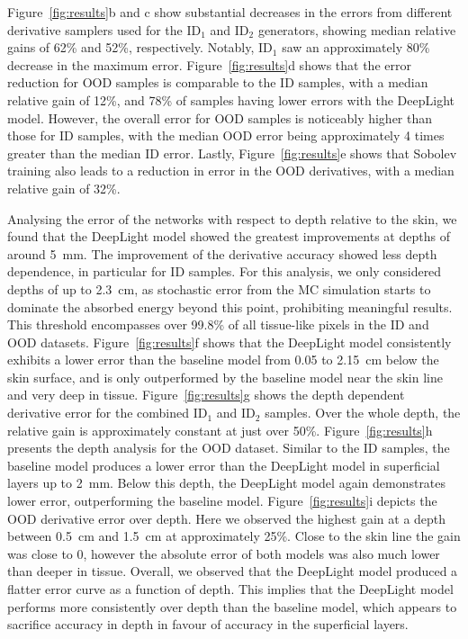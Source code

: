 \documentclass[journal,twoside,web]{ieeecolor}
\begin{document}
Figure~\ref{fig:results}b and c show substantial decreases in the errors from different derivative samplers used for the ID$_1$ and ID$_2$ generators, showing median relative gains of 62\% and 52\%, respectively. %
Notably, ID$_1$ saw an approximately 80\% decrease in the maximum error. %
Figure~\ref{fig:results}d shows that the error reduction for OOD samples is comparable to the ID samples, with a median relative gain of 12\%, and 78\% of samples having lower errors with the DeepLight model. %
However, the overall error for OOD samples is noticeably higher than those for ID samples, with the median OOD error being approximately 4 times greater than the median ID error. %
Lastly, Figure~\ref{fig:results}e shows that Sobolev training also leads to a reduction in error in the OOD derivatives, with a median relative gain of 32\%.\par %
    
Analysing the error of the networks with respect to depth relative to the skin, we found that the DeepLight model showed the greatest improvements at depths of around 5~mm. %
The improvement of the derivative accuracy showed less depth dependence, in particular for ID samples. %
For this analysis, we only considered depths of up to 2.3~cm, as stochastic error from the MC simulation starts to dominate the absorbed energy beyond this point, prohibiting meaningful results. %
This threshold encompasses over 99.8\% of all tissue-like pixels in the ID and OOD datasets. %
Figure~\ref{fig:results}f shows that the DeepLight model consistently exhibits a lower error than the baseline model from 0.05 to 2.15~cm below the skin surface, and is only outperformed by the baseline model near the skin line and very deep in tissue. %
Figure~\ref{fig:results}g shows the depth dependent derivative error for the combined ID$_1$ and ID$_2$ samples. %
Over the whole depth, the relative gain is approximately constant at just over 50\%. %
Figure~\ref{fig:results}h presents the depth analysis for the OOD dataset. %
Similar to the ID samples, the baseline model produces a lower error than the DeepLight model in superficial layers up to 2~mm. %
Below this depth, the DeepLight model again demonstrates lower error, outperforming the baseline model. %
Figure~\ref{fig:results}i depicts the OOD derivative error over depth. %
Here we observed the highest gain at a depth between 0.5~cm and 1.5~cm at approximately 25\%. %
Close to the skin line the gain was close to 0, however the absolute error of both models was also much lower than deeper in tissue. %
Overall, we observed that the DeepLight model produced a flatter error curve as a function of depth. %
This implies that the DeepLight model performs more consistently over depth than the baseline model, which appears to sacrifice accuracy in depth in favour of accuracy in the superficial layers.\par
\end{document}
